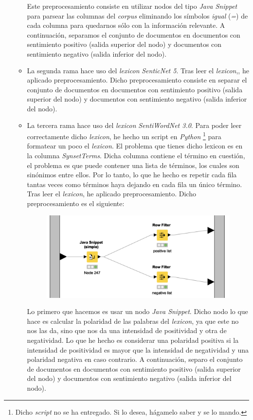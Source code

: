 \documentclass[11pt]{article}
\begin{document}
\begin{itemize}
\begin{itemize}
		Este preprocesamiento consiste en utilizar nodos del tipo \textit{Java Snippet} para parsear las columnas del \textit{corpus} eliminando los símbolos \textit{igual} (\textit{=}) de cada columna para quedarnos sólo con la información relevante. A continuación, separamos el conjunto de documentos en documentos con sentimiento positivo (salida superior del nodo) y documentos con sentimiento negativo (salida inferior del nodo).
		\item La segunda rama hace uso del \textit{lexicon} \textit{SenticNet 5}. Tras leer el \textit{lexicon},, he aplicado preprocesamiento. Dicho preprocesamiento consiste en separar el conjunto de documentos en documentos con sentimiento positivo (salida superior del nodo) y documentos con sentimiento negativo (salida inferior del nodo).
		\item La tercera rama hace uso del \textit{lexicon} \textit{SentiWordNet 3.0}. Para poder leer correctamente dicho \textit{lexicon}, he hecho un script en \textit{Python} \footnote{Dicho \textit{script} no se ha entregado. Si lo desea, hágamelo saber y se lo mando.} para formatear un poco el \textit{lexicon}. El problema que tienes dicho lexicon es en la columna \textit{SynsetTerms}. Dicha columna contiene el término en cuestión, el problema es que puede contener una lista de términos, los cuales son sinónimos entre ellos. Por lo tanto, lo que he hecho es repetir cada fila tantas veces como términos haya dejando en cada fila un único término. Tras leer el \textit{lexicon}, he aplicado preprocesamiento. Dicho preprocesamiento es el siguiente:
		
		\begin{figure}[H]
			\centering
			\includegraphics[width=0.5\linewidth]{images/SentiWordNet_preprocessing.png}
		\end{figure}
		
		Lo primero que hacemos es usar un nodo \textit{Java Snippet}. Dicho nodo lo que hace es calcular la polaridad de las palabras del \textit{lexicon}, ya que este no nos las da, sino que nos da una intensidad de positividad y otra de negatividad. Lo que he hecho es considerar una polaridad positiva si la intensidad de positividad es mayor que la intensidad de negatividad y una polaridad negativa en caso contrario. A continuación, separo el conjunto de documentos en documentos con sentimiento positivo (salida superior del nodo) y documentos con sentimiento negativo (salida inferior del nodo).
	\end{itemize}


\end{itemize}
\end{document}
